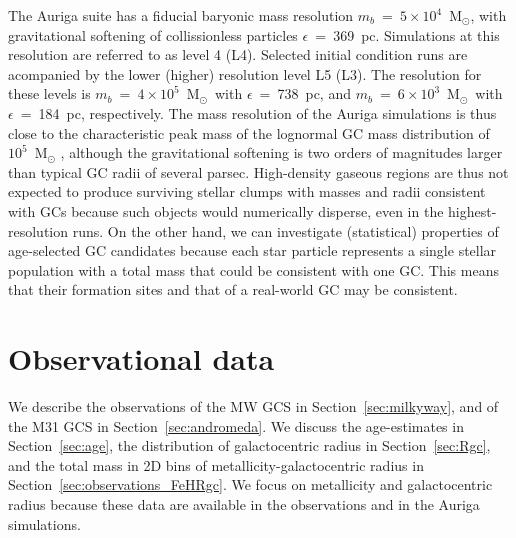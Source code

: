 \documentclass[a4paper,fleqn,usenatbib]{mnras}
\newcommand{\Sun}[0]{\ensuremath{_{\odot}}}
\begin{document}
The Auriga suite has a fiducial baryonic mass resolution $m_b$~=~$5 \times 10^4$~M\Sun,
with gravitational softening of collissionless particles $\epsilon$~=~369~pc.
Simulations at this resolution are referred to as level 4 (L4). Selected
initial condition runs are acompanied by the lower (higher) resolution level L5 (L3).
The resolution for these levels is $m_b$~=~$4 \times 10^5$~M\Sun \, with 
$\epsilon$~=~738~pc, and $m_b$~=~$6 \times 10^3$~M\Sun \, with $\epsilon$~=~184~pc,
respectively. The mass resolution of the Auriga simulations is thus close to the 
characteristic peak mass of the lognormal GC mass distribution of $10^{5}$~M\Sun 
\citep{1991ARA&A..29..543H}, although the gravitational softening is two orders 
of magnitudes larger than typical GC radii of several parsec. High-density gaseous 
regions are thus not expected to produce surviving stellar clumps with masses and 
radii consistent with GCs because such objects would numerically disperse, even 
in the highest-resolution runs. On the other hand, we can investigate (statistical) 
properties of age-selected GC candidates because each star particle represents a
single stellar population with a total mass that could be consistent with one GC. 
This means that their formation sites and that of a real-world GC may be consistent.

\section{Observational data}
\label{sec:observations}
We describe the observations of the MW GCS in Section~\ref{sec:milkyway},
and of the M31 GCS in Section~\ref{sec:andromeda}. We discuss the age-estimates
in Section~\ref{sec:age}, the distribution of galactocentric radius in 
Section~\ref{sec:Rgc}, and the total mass in 2D bins of metallicity-galactocentric
radius in Section~\ref{sec:observations_FeHRgc}. We focus on metallicity and
galactocentric radius because these data are available in the observations and
in the Auriga simulations.
\end{document}
